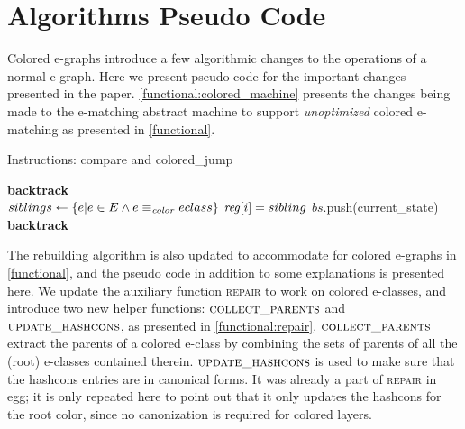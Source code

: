 \section{Algorithms Pseudo Code}
\label{app:algorithms}

Colored e-graphs introduce a few algorithmic changes to the operations of a normal e-graph.
Here we present pseudo code for the important changes presented in the paper.
\autoref{functional:colored_machine} presents the changes being made to the e-matching abstract machine to support \emph{unoptimized} colored e-matching as presented in \autoref{functional}.

\begin{algorithm}
\caption{ \label{functional:colored_machine}
Instructions: compare and colored\_jump}
\begin{algorithmic}[1]

    \If{$\tfind(\tcolor, \treg[i]) \neq \tfind(\tcolor, \treg[j])$}
        \State \textbf{backtrack}
    \EndIf
\EndFunction
\\
    \State $siblings \gets \{e | e \in E \land e \equiv_{\mathit{color}} eclass\}$
        \State $\mathit{reg}[i] = sibling$
        \State $bs$.push(current\_state)
    \EndFor
    \State \textbf{backtrack}
\EndFunction

\end{algorithmic}
\end{algorithm}

\begin{comment}
Formalize the colored-rebuild algorithm
This should include an algorithmic description of normal rebuild
Then we would use functions to use the same algorithm for colored rebuild.
The main concerns that change are:
1. Collecting all the parents
2. Updating the memo
\end{comment}

The rebuilding algorithm is also updated to accommodate for colored e-graphs in \autoref{functional}, and the pseudo code in addition to some explanations is presented here.
We update the auxiliary function \textsc{repair} to work on colored e-classes,
and introduce two new helper functions: $\textsc{collect\_parents}$ and $\textsc{update\_hashcons}$, as presented in \autoref{functional:repair}.
$\textsc{collect\_parents}$ extract the parents of a colored e-class by combining the sets of parents of all the (root) e-classes contained therein.
$\textsc{update\_hashcons}$ is used to make sure that the hashcons entries are in canonical forms. It was already a part of \textsc{repair} in egg;
it is only repeated here to point out that it
only updates the hashcons for the root color,
since no canonization is required for colored layers.    


